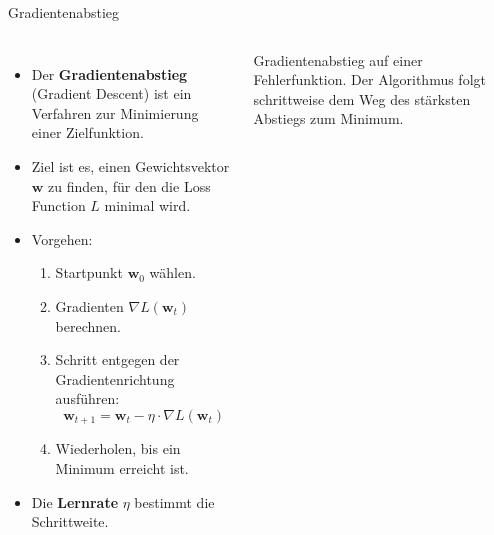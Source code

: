 \begin{frame}{Gradientenabstieg}
\footnotesize
\begin{columns}

\begin{itemize}
    \item Der \textbf{Gradientenabstieg} (Gradient Descent) ist ein Verfahren zur Minimierung einer Zielfunktion.

    \item Ziel ist es, einen Gewichtsvektor $\mathbf{w}$ zu finden, für den die Loss Function $L$ minimal wird.

    \item Vorgehen:
    \begin{enumerate}
      \footnotesize
        \item Startpunkt $\mathbf{w}_0$ wählen.
        \item Gradienten $\nabla L(\mathbf{w}_t)$ berechnen.
        \item Schritt entgegen der Gradientenrichtung ausführen:
        \[
            \mathbf{w}_{t+1}
            =
            \mathbf{w}_t
            -
            \eta \cdot \nabla L(\mathbf{w}_t)
        \]
        \item Wiederholen, bis ein Minimum erreicht ist.
    \end{enumerate}

    \item Die \textbf{Lernrate} $\eta$ bestimmt die Schrittweite.
\end{itemize}


\centering


{\scriptsize Gradientenabstieg auf einer Fehlerfunktion. Der Algorithmus folgt schrittweise dem Weg des stärksten Abstiegs zum Minimum.}

\end{columns}
\end{frame}

